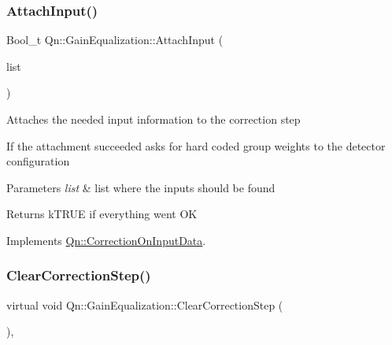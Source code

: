 \mbox{\label{classQn_1_1GainEqualization_a167a6348fcdf8c0f48cb16a3dd9d1c29}} 
\subsubsection{\texorpdfstring{Attach\+Input()}{AttachInput()}}
{\footnotesize\ttfamily Bool\+\_\+t Qn\+::\+Gain\+Equalization\+::\+Attach\+Input (\begin{DoxyParamCaption}\item[{T\+List $\ast$}]{list }\end{DoxyParamCaption})\hspace{0.3cm}{\ttfamily [virtual]}}

Attaches the needed input information to the correction step

If the attachment succeeded asks for hard coded group weights to the detector configuration 
\begin{DoxyParams}{Parameters}
{\em list} & list where the inputs should be found \\
\hline
\end{DoxyParams}
\begin{DoxyReturn}{Returns}
k\+T\+R\+UE if everything went OK 
\end{DoxyReturn}


Implements \mbox{\hyperlink{classQn_1_1CorrectionOnInputData_a37c53966c0121ed0f7d764a9769690be}{Qn\+::\+Correction\+On\+Input\+Data}}.

\mbox{\label{classQn_1_1GainEqualization_a8ee1f2ecf6929de35d455515a067ac9c}} 
\subsubsection{\texorpdfstring{Clear\+Correction\+Step()}{ClearCorrectionStep()}}
{\footnotesize\ttfamily virtual void Qn\+::\+Gain\+Equalization\+::\+Clear\+Correction\+Step (\begin{DoxyParamCaption}{ }\end{DoxyParamCaption})\hspace{0.3cm}{\ttfamily [inline]}, {\ttfamily [virtual]}}

